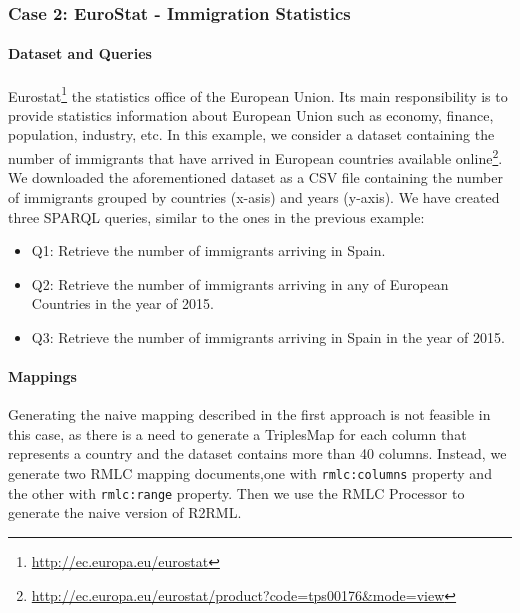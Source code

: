 \subsubsection{Case 2: EuroStat - Immigration Statistics}
\noindent\paragraph{Dataset and Queries} Eurostat\footnote{\url{http://ec.europa.eu/eurostat}} the statistics office of the European Union. Its main responsibility is to provide statistics information about European Union such as economy, finance, population, industry, etc. In this example, we consider a dataset containing the number of immigrants that have arrived in European countries available online\footnote{\url{http://ec.europa.eu/eurostat/product?code=tps00176&mode=view}}. We downloaded the aforementioned dataset as a CSV file containing the number of immigrants grouped by countries (x-asis) and years (y-axis). We have created three SPARQL queries, similar to the ones in the previous example:

\begin{itemize}
\item Q1: Retrieve the number of immigrants arriving in Spain.
\item Q2: Retrieve the number of immigrants arriving in any of European Countries in the year of 2015.
\item Q3: Retrieve the number of immigrants arriving in Spain in the year of 2015.
\end{itemize}

\noindent\paragraph{Mappings}
Generating the naive mapping described in the first approach is not feasible in this case, as there is a need to generate a TriplesMap for each column that represents a country and the dataset contains more than 40 columns. Instead, we generate two RMLC mapping documents,one with \texttt{rmlc:columns} property and the other with \texttt{rmlc:range} property. Then we use the RMLC Processor to generate the naive version of R2RML.

